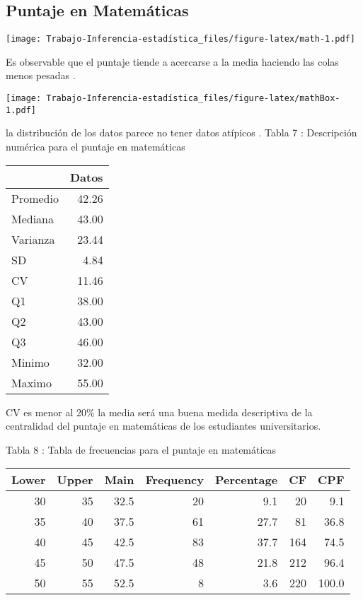 \documentclass[
  man]{apa6}
\begin{document}
\hypertarget{puntaje-en-matemuxe1ticas}{%
\subsection{Puntaje en Matemáticas}\label{puntaje-en-matemuxe1ticas}}

\texttt{[image: Trabajo-Inferencia-estadística\_files/figure-latex/math-1.pdf]}

Es observable que el puntaje tiende a acercarse a la media haciendo las
colas menos pesadas .

\texttt{[image: Trabajo-Inferencia-estadística\_files/figure-latex/mathBox-1.pdf]}

la distribución de los datos parece no tener datos atípicos . \clearpage
Tabla 7 : Descripción numérica para el puntaje en matemáticas

\begin{center}

\begin{tabular}{l|r}
\hline
  & Datos\\
\hline
Promedio & 42.26\\
\hline
Mediana & 43.00\\
\hline
Varianza & 23.44\\
\hline
SD & 4.84\\
\hline
CV & 11.46\\
\hline
Q1 & 38.00\\
\hline
Q2 & 43.00\\
\hline
Q3 & 46.00\\
\hline
Minimo & 32.00\\
\hline
Maximo & 55.00\\
\hline
\end{tabular}
\end{center}

CV es menor al 20\% la media será una buena medida descriptiva de la
centralidad del puntaje en matemáticas de los estudiantes
universitarios.

Tabla 8 : Tabla de frecuencias para el puntaje en matemáticas

\begin{center}


\begin{tabular}{r|r|r|r|r|r|r}
\hline
Lower & Upper & Main & Frequency & Percentage & CF & CPF\\
\hline
30 & 35 & 32.5 & 20 & 9.1 & 20 & 9.1\\
\hline
35 & 40 & 37.5 & 61 & 27.7 & 81 & 36.8\\
\hline
40 & 45 & 42.5 & 83 & 37.7 & 164 & 74.5\\
\hline
45 & 50 & 47.5 & 48 & 21.8 & 212 & 96.4\\
\hline
50 & 55 & 52.5 & 8 & 3.6 & 220 & 100.0\\
\hline
\end{tabular}
\end{center}
\end{document}
